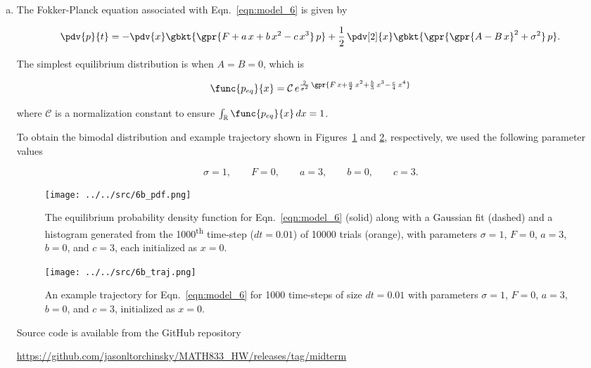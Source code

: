 \begin{enumerate}[a)]
	\item The Fokker-Planck equation associated with Eqn.~\ref{eqn:model_6} is given by
	
	\begin{equation}
		\pdv{p}{t} = -\pdv{x}\gbkt{\gpr{F + a\,x + b\,x^2 - c\,x^3}\,p} + \frac{1}{2}\,\pdv[2]{x}\gbkt{\gpr{\gpr{A - B\,x}^2 + \sigma^2}\,p}.
	\end{equation}
	
	The simplest equilibrium distribution is when $A = B = 0$, which is
	
	\begin{equation}
		\func{p_{eq}}{x} = \mathcal{C}\,e^{\frac{2}{\sigma^2}\,\gpr{F\,x + \frac{a}{2}\,x^2 + \frac{b}{3}\,x^3 - \frac{c}{4}\,x^4}}
	\end{equation}
	
	where $\mathcal{C}$ is a normalization constant to ensure $\int_{\mathbb{R}} \func{p_{eq}}{x}\,dx = 1$.
	
	To obtain the bimodal distribution and example trajectory shown in Figures~\ref{fig:6b_pdf} and \ref{fig:6b_traj}, respectively, we used the following parameter values
	
	\begin{equation}
		\sigma = 1,\qquad F = 0,\qquad a = 3,\qquad b = 0,\qquad c = 3.
	\end{equation}
	
	\begin{figure}[H]
		\centering
		\texttt{[image: ../../src/6b\_pdf.png]}
		\caption{The equilibrium probability density function for Eqn.~\ref{eqn:model_6} (solid) along with a Gaussian fit (dashed) and a histogram generated from the 1000\textsuperscript{th} time-step ($dt = 0.01$) of 10000 trials (orange), with parameters $\sigma = 1$, $F = 0$, $a = 3$, $b = 0$, and $c = 3$, each initialized as $x = 0$.}
		\label{fig:6b_pdf}
	\end{figure}
	
	\begin{figure}[H]
		\centering
		\texttt{[image: ../../src/6b\_traj.png]}
		\caption{An example trajectory for Eqn.~\ref{eqn:model_6} for 1000 time-steps of size $dt = 0.01$ with parameters $\sigma = 1$, $F = 0$, $a = 3$, $b = 0$, and $c = 3$, initialized as $x = 0$.}
		\label{fig:6b_traj}
	\end{figure}
	
	Source code is available from the GitHub repository
	
	\begin{center}
		\url{https://github.com/jasonltorchinsky/MATH833_HW/releases/tag/midterm}
	\end{center}


\end{enumerate}
